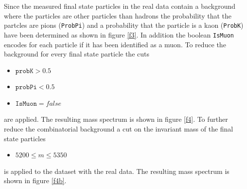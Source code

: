 Since the measured final state particles in the real data contain a background where the particles are other particles than hadrons the probability that the 
partcles are pions (\texttt{ProbPi}) and a probability that the particle is a kaon (\texttt{ProbK}) have been determined as shown 
in figure \ref{f3}. In addition the boolean 
\texttt{IsMuon} encodes for each particle if it has been identified as a muon.
To reduce the background for every final state particle the cuts 
\begin{itemize}
  \item $\texttt{probK} > 0.5$
  \item $\texttt{probPi} < 0.5$
  \item $\texttt{IsMuon} = false$
\end{itemize}
are applied. The resulting mass spectrum is shown in figure \ref{f4}.
To further reduce the combinatorial background a cut on the invariant mass of the final state particles
\begin{itemize}
  \item $5200 \leq m \leq 5350$
\end{itemize}
is applied to the dataset with the real data. The resulting mass spectrum is shown in figure \ref{f4b}.


